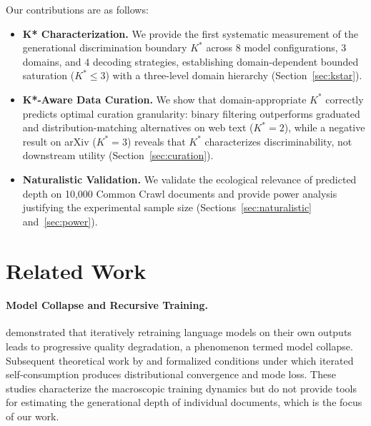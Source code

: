 \documentclass[11pt,a4paper]{article}
\begin{document}
Our contributions are as follows:
\begin{itemize}
    \item \textbf{K* Characterization.} We provide the first systematic measurement of the generational discrimination boundary $K^*$ across 8 model configurations, 3 domains, and 4 decoding strategies, establishing domain-dependent bounded saturation ($K^* \leq 3$) with a three-level domain hierarchy (Section~\ref{sec:kstar}).
    \item \textbf{K*-Aware Data Curation.} We show that domain-appropriate $K^*$ correctly predicts optimal curation granularity: binary filtering outperforms graduated and distribution-matching alternatives on web text ($K^*{=}2$), while a negative result on arXiv ($K^*{=}3$) reveals that $K^*$ characterizes discriminability, not downstream utility (Section~\ref{sec:curation}).
    \item \textbf{Naturalistic Validation.} We validate the ecological relevance of predicted depth on 10,000 Common Crawl documents and provide power analysis justifying the experimental sample size (Sections~\ref{sec:naturalistic} and~\ref{sec:power}).
\end{itemize}


\section{Related Work}

\paragraph{Model Collapse and Recursive Training.}
\citet{shumailov2024model} demonstrated that iteratively retraining language models on their own outputs leads to progressive quality degradation, a phenomenon termed model collapse. Subsequent theoretical work by \citet{alemohammad2024selfconsuming} and \citet{dohmatob2024tale} formalized conditions under which iterated self-consumption produces distributional convergence and mode loss. These studies characterize the macroscopic training dynamics but do not provide tools for estimating the generational depth of individual documents, which is the focus of our work.
\end{document}
